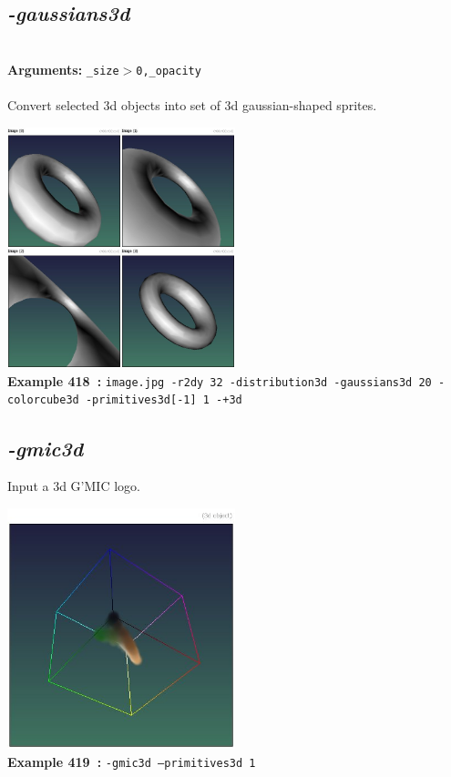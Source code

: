 \documentclass[a4paper,11pt,twoside]{book}
\begin{document}
\subsection{\emph{-gaussians3d} }\vspace*{-0.5em}
~\\\textbf{Arguments: } 
{\small \texttt{\_size$>$0,\_opacity}}\\~\\
Convert selected 3d objects into set of 3d gaussian-shaped sprites.
\begin{center}\includegraphics[keepaspectratio=true,height=7cm,width=\textwidth]{img/gmic_def418.jpg}\\
{\footnotesize \textbf{Example 418~:} \texttt{image.jpg -r2dy 32 -distribution3d -gaussians3d 20 -colorcube3d -primitives3d[-1] 1 -+3d}}
\end{center}

\subsection{\emph{-gmic3d} }\vspace*{-0.5em}
Input a 3d G'MIC logo.
\begin{center}\includegraphics[keepaspectratio=true,height=7cm,width=\textwidth]{img/gmic_def419.jpg}\\
{\footnotesize \textbf{Example 419~:} \texttt{-gmic3d --primitives3d 1}}
\end{center}
\end{document}
